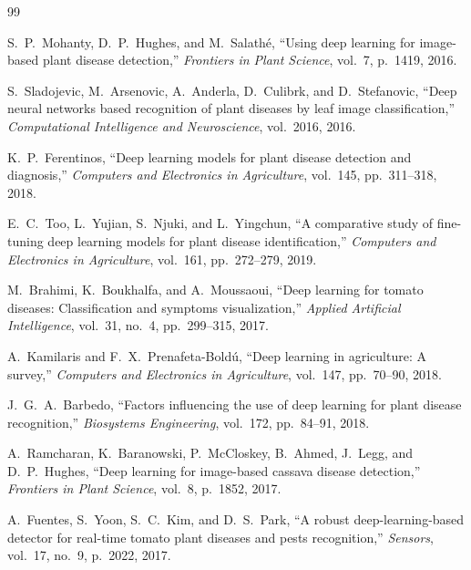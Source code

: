 \newpage
\begin{thebibliography}{99}

S.\ P.\ Mohanty, D.\ P.\ Hughes, and M.\ Salathé,
``Using deep learning for image-based plant disease detection,''
\textit{Frontiers in Plant Science}, vol.\ 7, p.\ 1419, 2016.

S.\ Sladojevic, M.\ Arsenovic, A.\ Anderla, D.\ Culibrk, and D.\ Stefanovic,
``Deep neural networks based recognition of plant diseases by leaf image
classification,''
\textit{Computational Intelligence and Neuroscience}, vol.\ 2016, 2016.

K.\ P.\ Ferentinos,
``Deep learning models for plant disease detection and diagnosis,''
\textit{Computers and Electronics in Agriculture}, vol.\ 145, pp.\ 311--318,
2018.

E.\ C.\ Too, L.\ Yujian, S.\ Njuki, and L.\ Yingchun,
``A comparative study of fine-tuning deep learning models for plant disease
identification,''
\textit{Computers and Electronics in Agriculture}, vol.\ 161, pp.\ 272--279,
2019.

M.\ Brahimi, K.\ Boukhalfa, and A.\ Moussaoui,
``Deep learning for tomato diseases: Classification and symptoms
visualization,''
\textit{Applied Artificial Intelligence}, vol.\ 31, no.\ 4, pp.\ 299--315,
2017.

A.\ Kamilaris and F.\ X.\ Prenafeta-Boldú,
``Deep learning in agriculture: A survey,''
\textit{Computers and Electronics in Agriculture}, vol.\ 147, pp.\ 70--90,
2018.

J.\ G.\ A.\ Barbedo,
``Factors influencing the use of deep learning for plant disease
recognition,''
\textit{Biosystems Engineering}, vol.\ 172, pp.\ 84--91, 2018.

A.\ Ramcharan, K.\ Baranowski, P.\ McCloskey, B.\ Ahmed, J.\ Legg, and
D.\ P.\ Hughes,
``Deep learning for image-based cassava disease detection,''
\textit{Frontiers in Plant Science}, vol.\ 8, p.\ 1852, 2017.

A.\ Fuentes, S.\ Yoon, S.\ C.\ Kim, and D.\ S.\ Park,
``A robust deep-learning-based detector for real-time tomato plant diseases
and pests recognition,''
\textit{Sensors}, vol.\ 17, no.\ 9, p.\ 2022, 2017.


\end{thebibliography}
